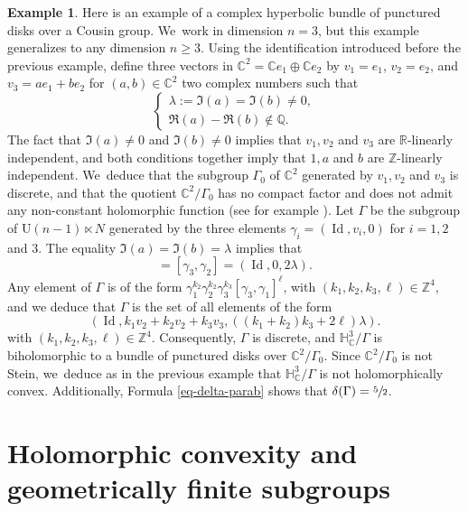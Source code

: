 \documentclass[JEP,XML,SOM,Unicode,NoEqCountersInSection,published]{cedram}
\theoremstyle{definition}
\newtheorem*{example}{Example}
\newcommand{\C}{\mathbb{C}}
\newcommand{\R}{\mathbb{R}}
\newcommand{\Z}{\mathbb{Z}}
\DeclareMathOperator{\Id}{Id}
\def\C{\mathbb{C}}
\begin{document}
\begin{example}Here is an example of a complex hyperbolic bundle of punctured disks over a Cousin group. We~work in dimension $n=3$, but this example generalizes to any dimension $n\ge3$. Using the identification introduced before the previous example, define three vectors in $\C^{2}=\C e_1\oplus \C e_2$ by $v_1=e_1$, $v_2=e_2$, and $v_3=ae_1+be_2$ for $(a,b)\in \C^{2}$ two complex numbers such that
\begin{equation*}
\left\{\begin{array}{l}
\lambda:=\Im(a)=\Im(b)\ne 0, \\
\Re(a)-\Re(b) \notin \mathbb{Q}.
\end{array}\right.
\end{equation*}
The fact that $\Im(a)\ne0$ and $\Im(b)\ne0$ implies that $v_1,v_2$ and $v_3$ are $\R$-linearly independent, and both conditions together imply that $1,a$ and $b$ are $\Z$-linearly independent. We~deduce that the subgroup $\Gamma_0$ of $\C^{2}$ generated by $v_1,v_2$ and $v_3$ is discrete, and that the quotient $\C^{2}/\Gamma_0$ has no compact factor and does not admit any non-constant holomorphic function (see for example \cite[pp.\,451-452]{napierConvexityPropertiesCoverings1990}).
Let $\Gamma$ be the subgroup of $\mathrm{U}(n-1)\ltimes N$ generated by the three elements $\gamma_i=(\Id,v_i,0)$ for $i=1,2$ and $3$.
The equality $\Im(a)=\Im(b)=\lambda$ implies that
\begin{equation*}
[\gamma_3,\gamma_1]=[\gamma_3,\gamma_2] = (\Id,0,2\lambda).
\end{equation*}
Any element of $\Gamma$ is of the form $\gamma_1^{k_2}\gamma_2^{k_2}\gamma_3^{k_3}[\gamma_3,\gamma_1]^{\ell}$,
with $(k_1,k_2,k_3,\ell)\in \Z^{4}$, and we deduce that $\Gamma$ is the set of all elements of the form
\begin{equation*}
(\Id,k_1v_2+k_2v_2+k_3v_3,((k_1+k_2)k_3+2\ell)\lambda).
\end{equation*}
with $(k_1,k_2,k_3,\ell)\in \Z^{4}$. Consequently, $\Gamma$ is discrete, and $\mathbb{H}^{3}_{\C}/\Gamma$ is biholomorphic to a bundle of punctured disks over $\C^{2}/\Gamma_0$. Since $\C^{2}/\Gamma_0$ is not Stein, we~deduce as in the previous example that $\mathbb{H}^{3}_{\C}/\Gamma$ is not holomorphically convex. Additionally, Formula \eqref{eq-delta-parab} shows that $\delta(\Gamma)=\sfrac{5}{2}$.
\end{example}

\section{Holomorphic convexity and geometrically finite subgroups}\label{section-hol-cvx-geom-fini}
\end{document}
